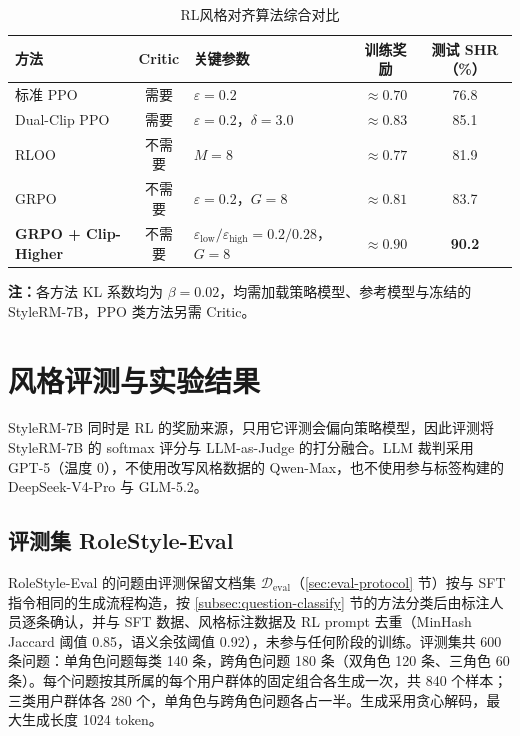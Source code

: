 \documentclass[fontset=fandol,type=master,campus=shenzhen,etitleauto=true]{hithesisbook}
\begin{document}
\begin{table}[htbp]
\centering
\caption{RL风格对齐算法综合对比}
\label{tab:rl-comparison}
\small
\setlength{\tabcolsep}{5pt}
\renewcommand{\arraystretch}{1.15}
\begin{tabular}{l c l c c}
\toprule
\textbf{方法} & \textbf{Critic} & \textbf{关键参数} & \textbf{训练奖励} & \textbf{测试 SHR（\%）} \\
\midrule
标准 PPO & 需要 & $\varepsilon=0.2$ & $\approx 0.70$ & 76.8 \\
Dual-Clip PPO & 需要 & $\varepsilon=0.2$，$\delta=3.0$ & $\approx 0.83$ & 85.1 \\
RLOO & 不需要 & $M=8$ & $\approx 0.77$ & 81.9 \\
GRPO & 不需要 & $\varepsilon=0.2$，$G=8$ & $\approx 0.81$ & 83.7 \\
\textbf{GRPO + Clip-Higher} & 不需要 & $\varepsilon_{\text{low}}/\varepsilon_{\text{high}}=0.2/0.28$，$G=8$ & $\mathbf{\approx 0.90}$ & \textbf{90.2} \\
\bottomrule
\end{tabular}

\vspace{0.2cm}
\parbox{\linewidth}{\small \textbf{注：}各方法 KL 系数均为 $\beta = 0.02$，均需加载策略模型、参考模型与冻结的 StyleRM-7B，PPO 类方法另需 Critic。}
\end{table}

\section{风格评测与实验结果}\label{ux98ceux683cux8bc4ux6d4bux4f53ux7cfb}

StyleRM-7B 同时是 RL 的奖励来源，只用它评测会偏向策略模型，因此评测将 StyleRM-7B 的 softmax 评分与 LLM-as-Judge 的打分融合。LLM 裁判采用 GPT-5（温度 0），不使用改写风格数据的 Qwen-Max，也不使用参与标签构建的 DeepSeek-V4-Pro 与 GLM-5.2。

\subsection{评测集 RoleStyle-Eval}\label{subsec:scenariostyle-eval}

RoleStyle-Eval 的问题由评测保留文档集 $\mathcal{D}_{\text{eval}}$（\ref{sec:eval-protocol} 节）按与 SFT 指令相同的生成流程构造，按 \ref{subsec:question-classify} 节的方法分类后由标注人员逐条确认，并与 SFT 数据、风格标注数据及 RL prompt 去重（MinHash Jaccard 阈值 0.85，语义余弦阈值 0.92），未参与任何阶段的训练。评测集共 600 条问题：单角色问题每类 140 条，跨角色问题 180 条（双角色 120 条、三角色 60 条）。每个问题按其所属的每个用户群体的固定组合各生成一次，共 840 个样本；三类用户群体各 280 个，单角色与跨角色问题各占一半。生成采用贪心解码，最大生成长度 1024 token。
\end{document}
